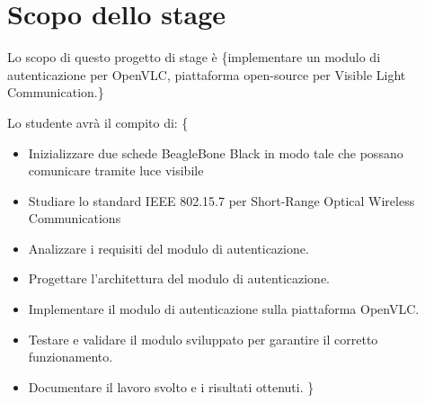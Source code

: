 \section*{Scopo dello stage}
Lo scopo di questo progetto di stage è \{implementare un modulo di autenticazione per OpenVLC, piattaforma open-source per Visible Light Communication.\}

Lo studente avrà il compito di: \{
\begin{itemize}
    \item Inizializzare due schede BeagleBone Black in modo tale che possano comunicare tramite luce visibile
    \item Studiare lo standard IEEE 802.15.7 per Short-Range Optical Wireless Communications
    \item Analizzare i requisiti del modulo di autenticazione.
    \item Progettare l'architettura del modulo di autenticazione.
    \item Implementare il modulo di autenticazione sulla piattaforma OpenVLC.
    \item Testare e validare il modulo sviluppato per garantire il corretto funzionamento.
    \item Documentare il lavoro svolto e i risultati ottenuti. \}
\end{itemize}

